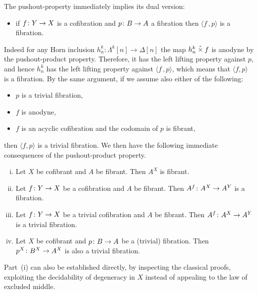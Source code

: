 \documentclass[reqno,10pt,a4paper,oneside,draft]{amsart}
\begin{document}
The pushout-property immediately implies its dual version: 
\begin{itemize}
\item if $f \colon Y \to X$ is a cofibration and $p \colon B \to A$ a fibration then $\langle f \, , p \rangle$ is a fibration.
\end{itemize}
 Indeed for any Horn inclusion $h^k_n: \Lambda^k[n] \rightarrow \Delta[n]$ the map $h^k_n \mathbin{\hat{\times}} f$ is anodyne by the pushout-product property. Therefore,  it has the left lifting property against $p$, and hence $h^k_n$ has the left lifting property against $\langle f \, , p  \rangle$, which means that   $\langle f, p \rangle$ is a fibration. By the same argument, if we  assume also either of the following:
\begin{itemize}
\item $p$ is a trivial fibration,
\item $f$ is anodyne,
\item $f$ is an acyclic cofibration and the codomain of $p$ is fibrant,
\end{itemize}
then $\langle f , p \rangle$ is a trivial fibration.  We then have the following immediate consequences of the pushout-product property.



\begin{lemma} \hfill 
 \label{thm:exponentials}
\begin{enumerate}[(i)] 
\item Let $X$ be cofibrant and $A$ be fibrant.  Then $A^X$ is fibrant.
\item Let $f \colon Y \rightarrow X$ be a cofibration and $A$ be fibrant. Then $A^f \colon A^X \rightarrow A^Y$ is a fibration.
\item Let $f \colon Y \rightarrow X$ be a trivial cofibration and $A$ be fibrant.  Then $A^f \colon A^X \rightarrow A^Y$ is a trivial fibration.
\item Let $X$ be cofibrant and $p \colon B \rightarrow A$ be a (trivial) fibration. Then $p^X \colon B^X \rightarrow A^X$ is also a trivial fibration.
\end{enumerate}
\end{lemma}

Part~(i) can also be established directly, by inspecting the classical proofs, exploiting the decidability of degeneracy in $X$ instead of appealing to the law of excluded middle.






\medskip
\end{document}
